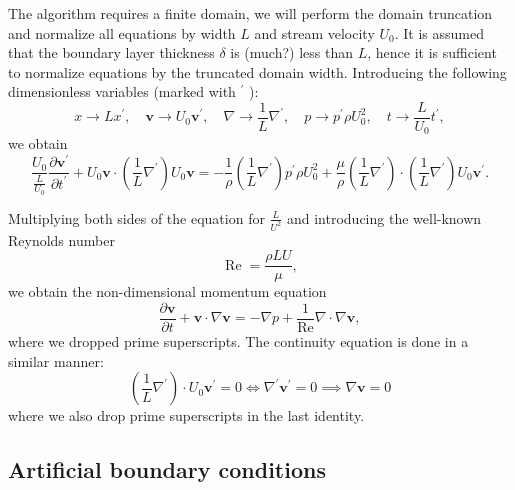 \documentclass{article}
\begin{document}
The algorithm requires a finite domain, we will perform the domain truncation and normalize all equations by width $L$ and stream velocity $U_0$. It is assumed that the boundary layer thickness $\delta$ is (much?) less than $L$, hence it is sufficient to normalize equations by the truncated domain width. 
Introducing the following dimensionless variables (marked with ${ }^{\prime}$ ):
\begin{equation*}
	x\to Lx^{\prime},  \quad 
	\boldsymbol{v}\to U_0\boldsymbol{v}^{\prime}, \quad 
	\nabla\to \frac{1}{L}\nabla^{\prime}, \quad 
	p\to p^{\prime} \rho U_0^2, \quad 
	t\to \frac{L}{U_0}t^{\prime},
\end{equation*}
we obtain
\begin{equation*}
	\frac{U_0}{\frac{L}{U_0}} \frac{\partial \boldsymbol{v}^{\prime}}{\partial t^{\prime}}+U_0\boldsymbol{v}\cdot\left(\frac{1}{L} \nabla^{\prime}\right) U_0\boldsymbol{v}=-\frac{1}{\rho}\left(\frac{1}{L} \nabla^{\prime}\right){p^{\prime}\rho U^2_0}+\frac{\mu}{\rho} \left(\frac{1}{L} \nabla^{\prime}\right) \cdot\left(\frac{1}{L} \nabla^{\prime}\right) U_0\boldsymbol{v}^{\prime}.
\end{equation*}

Multiplying both sides of the equation for $\frac{L}{U^2}$ and introducing the well-known Reynolds number 
\begin{equation*}
\operatorname{Re}=\frac{\rho L U}{\mu},
\end{equation*}
we obtain the non-dimensional momentum equation
\begin{equation}
	\frac{\partial \boldsymbol{v}}{\partial t} + \boldsymbol{v} \cdot \nabla \boldsymbol{v} = -\nabla p + \frac{1}{\operatorname{Re}} \nabla \cdot \nabla \boldsymbol{v},
\end{equation}
where we dropped prime superscripts. The continuity equation is done in a similar manner:
\begin{equation}
	\left(\frac{1}{L} \nabla^{\prime}\right) \cdot U_0\boldsymbol{v}^{\prime}=0\iff\nabla^{\prime}\boldsymbol{v}^{\prime}=0\implies\nabla\boldsymbol{v}=0
\end{equation}
where we also drop prime superscripts in the last identity.

\subsection{Artificial boundary conditions}\label{sec:artificial-bc}
\end{document}
